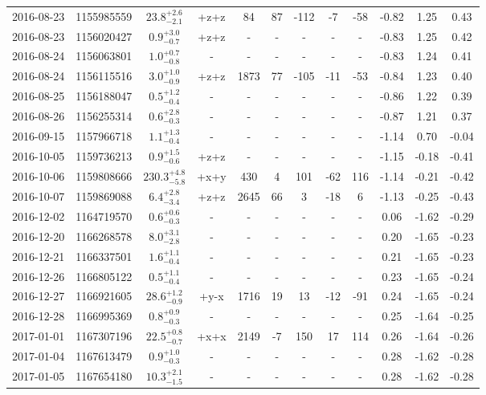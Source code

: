\begin{longtable*}{|c|c|c|c|c|c|c|c|c|c|c|c|}
	2016-08-23 & 1155985559 & $23.8^{+2.6}_{-2.1}$ & +z+z & 84 & 87 & -112 & -7 & -58 & -0.82 & 1.25 & 0.43 \\
	2016-08-23 & 1156020427 & $ 0.9^{+3.0}_{-0.7}$ & +z+z & - & - & - & - & - & -0.83 & 1.25 & 0.42 \\
	2016-08-24 & 1156063801 & $ 1.0^{+0.7}_{-0.8}$ & - & - & - & - & - & - & -0.83 & 1.24 & 0.41 \\
	2016-08-24 & 1156115516 & $ 3.0^{+1.0}_{-0.9}$ & +z+z & 1873 & 77 & -105 & -11 & -53 & -0.84 & 1.23 & 0.40 \\
	2016-08-25 & 1156188047 & $ 0.5^{+1.2}_{-0.4}$ & - & - & - & - & - & - & -0.86 & 1.22 & 0.39 \\
	2016-08-26 & 1156255314 & $ 0.6^{+2.8}_{-0.3}$ & - & - & - & - & - & - & -0.87 & 1.21 & 0.37 \\
	2016-09-15 & 1157966718 & $ 1.1^{+1.3}_{-0.4}$ & - & - & - & - & - & - & -1.14 & 0.70 & -0.04 \\
	2016-10-05 & 1159736213 & $ 0.9^{+1.5}_{-0.6}$ & +z+z & - & - & - & - & - & -1.15 & -0.18 & -0.41 \\
	2016-10-06 & 1159808666 & $230.3^{+4.8}_{-5.8}$ & +x+y & 430 & 4 & 101 & -62 & 116 & -1.14 & -0.21 & -0.42 \\
	2016-10-07 & 1159869088 & $ 6.4^{+2.8}_{-3.4}$ & +z+z & 2645 & 66 & 3 & -18 & 6 & -1.13 & -0.25 & -0.43 \\
	2016-12-02 & 1164719570 & $ 0.6^{+0.6}_{-0.3}$ & - & - & - & - & - & - & 0.06 & -1.62 & -0.29 \\
	2016-12-20 & 1166268578 & $ 8.0^{+3.1}_{-2.8}$ & - & - & - & - & - & - & 0.20 & -1.65 & -0.23 \\
	2016-12-21 & 1166337501 & $ 1.6^{+1.1}_{-0.4}$ & - & - & - & - & - & - & 0.21 & -1.65 & -0.23 \\
	2016-12-26 & 1166805122 & $ 0.5^{+1.1}_{-0.4}$ & - & - & - & - & - & - & 0.23 & -1.65 & -0.24 \\
	2016-12-27 & 1166921605 & $28.6^{+1.2}_{-0.9}$ & +y-x & 1716 & 19 & 13 & -12 & -91 & 0.24 & -1.65 & -0.24 \\
	2016-12-28 & 1166995369 & $ 0.8^{+0.9}_{-0.3}$ & - & - & - & - & - & - & 0.25 & -1.64 & -0.25 \\
	2017-01-01 & 1167307196 & $22.5^{+0.8}_{-0.7}$ & +x+x & 2149 & -7 & 150 & 17 & 114 & 0.26 & -1.64 & -0.26 \\
	2017-01-04 & 1167613479 & $ 0.9^{+1.0}_{-0.3}$ & - & - & - & - & - & - & 0.28 & -1.62 & -0.28 \\
	2017-01-05 & 1167654180 & $10.3^{+2.1}_{-1.5}$ & - & - & - & - & - & - & 0.28 & -1.62 & -0.28 \\

\end{longtable*}
